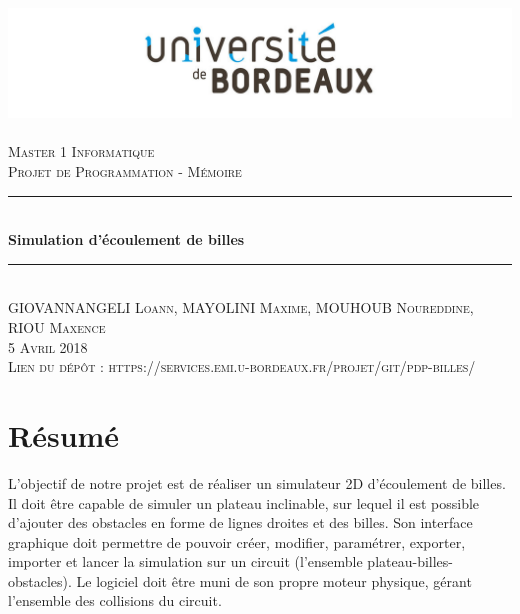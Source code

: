 \documentclass{report}
\newcommand{\HRule}{\rule{\linewidth}{0.5mm}}
\begin{document}
%
	\begin{titlepage}
	\begin{center}
		\includegraphics[scale=0.30]{universite-Bordeaux.jpg}~\\[1.5cm]
		\textsc{\LARGE Master 1 Informatique}\\[2cm]
		
		\textsc{\Large Projet de Programmation - Mémoire}\\[1.5cm]
		
		\HRule \\[0.4cm]
		{  \huge{\bfseries Simulation d'écoulement de billes}\\[0.4cm] }
		\HRule \\[2cm]
		
		\textsc{GIOVANNANGELI Loann, MAYOLINI Maxime, MOUHOUB Noureddine, RIOU Maxence}\\[0.4cm]
		
    	\textsc{\large 5 Avril 2018} \\
        \vspace{2cm}
        \textsc{Lien du dépôt : https://services.emi.u-bordeaux.fr/projet/git/pdp-billes/}
	\end{center}
	\end{titlepage}
    
    
\section*{Résumé}

L'objectif de notre projet est de réaliser un simulateur 2D d'écoulement de billes. Il doit être capable de simuler un plateau inclinable, sur lequel il est possible d’ajouter des obstacles en forme de lignes droites et des billes. Son interface graphique doit permettre de pouvoir créer, modifier, paramétrer, exporter, importer et lancer la simulation sur un circuit (l’ensemble plateau-billes-obstacles). Le logiciel doit être muni de son propre moteur physique, gérant l’ensemble des collisions du circuit. \\
\end{document}
